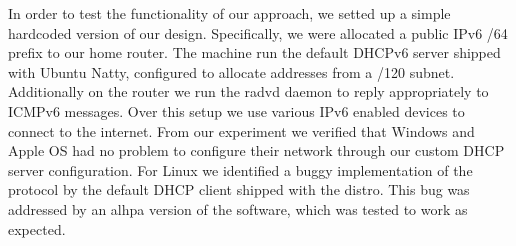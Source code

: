 


In order to test the functionality of our approach, we setted up a simple
hardcoded version of our design. Specifically, we were allocated a public IPv6
/64 prefix to our home router. The machine run the default DHCPv6 server shipped
with Ubuntu Natty, configured to allocate addresses from a /120 subnet.
Additionally on the router we run the radvd daemon to reply appropriately to
ICMPv6 messages.  Over this setup we use various IPv6 enabled devices to connect
to the internet.  From our experiment we verified that Windows and Apple OS had
no problem to configure their network through our custom DHCP server
configuration. For Linux we identified a buggy implementation of the protocol by
the default DHCP client shipped with the distro.  This bug was addressed by an
alhpa version of the software, which was tested to work as expected.

